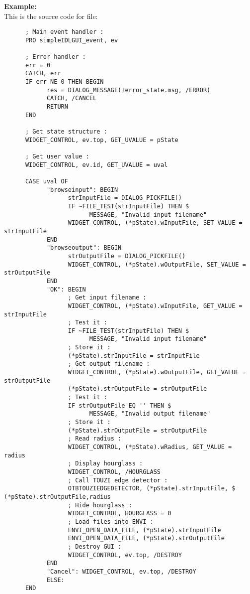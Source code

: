 \textbf{Example:}\\
      This is the source code for  file:\\
\begin{verbatim}
      ; Main event handler :
      PRO simpleIDLGUI_event, ev

      ; Error handler :
      err = 0
      CATCH, err
      IF err NE 0 THEN BEGIN
            res = DIALOG_MESSAGE(!error_state.msg, /ERROR)
            CATCH, /CANCEL
            RETURN
      END

      ; Get state structure :
      WIDGET_CONTROL, ev.top, GET_UVALUE = pState

      ; Get user value :
      WIDGET_CONTROL, ev.id, GET_UVALUE = uval

      CASE uval OF
            "browseinput": BEGIN
                  strInputFile = DIALOG_PICKFILE()
                  IF ~FILE_TEST(strInputFile) THEN $
                        MESSAGE, "Invalid input filename"
                  WIDGET_CONTROL, (*pState).wInputFile, SET_VALUE = strInputFile
            END
            "browseoutput": BEGIN
                  strOutputFile = DIALOG_PICKFILE()
                  WIDGET_CONTROL, (*pState).wOutputFile, SET_VALUE = strOutputFile
            END
            "OK": BEGIN
                  ; Get input filename :
                  WIDGET_CONTROL, (*pState).wInputFile, GET_VALUE = strInputFile
                  ; Test it :
                  IF ~FILE_TEST(strInputFile) THEN $
                        MESSAGE, "Invalid input filename"
                  ; Store it :
                  (*pState).strInputFile = strInputFile
                  ; Get output filename :
                  WIDGET_CONTROL, (*pState).wOutputFile, GET_VALUE = strOutputFile
                  (*pState).strOutputFile = strOutputFile
                  ; Test it :
                  IF strOutputFile EQ '' THEN $
                        MESSAGE, "Invalid output filename"
                  ; Store it :
                  (*pState).strOutputFile = strOutputFile
                  ; Read radius :
                  WIDGET_CONTROL, (*pState).wRadius, GET_VALUE = radius
                  ; Display hourglass :
                  WIDGET_CONTROL, /HOURGLASS
                  ; Call TOUZI edge detector :
                  OTBTOUZIEDGEDETECTOR, (*pState).strInputFile, $ (*pState).strOutputFile,radius
                  ; Hide hourglass :
                  WIDGET_CONTROL, HOURGLASS = 0
                  ; Load files into ENVI :
                  ENVI_OPEN_DATA_FILE, (*pState).strInputFile
                  ENVI_OPEN_DATA_FILE, (*pState).strOutputFile
                  ; Destroy GUI :
                  WIDGET_CONTROL, ev.top, /DESTROY
            END
            "Cancel": WIDGET_CONTROL, ev.top, /DESTROY
            ELSE:
      END


\end{verbatim}
